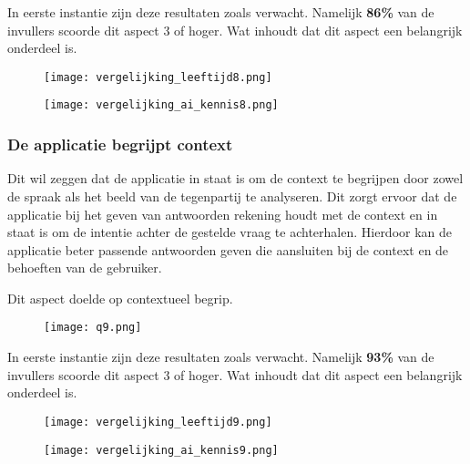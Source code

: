 In eerste instantie zijn deze resultaten zoals verwacht. Namelijk \textbf{86\%} van de invullers scoorde dit aspect 3 of hoger. Wat inhoudt dat dit aspect een belangrijk onderdeel is.

\begin{figure}[htbp]
    \centering
    \texttt{[image: vergelijking\_leeftijd8.png]}
    \label{fig:vergelijking_leeftijd8}
\end{figure}

\begin{figure}[htbp]
    \centering
    \texttt{[image: vergelijking\_ai\_kennis8.png]}
    \label{fig:vergelijking_ai_kennis8}
\end{figure}

\subsubsection{De applicatie begrijpt context}

Dit wil zeggen dat de applicatie in staat is om de context te begrijpen door zowel de spraak als het beeld van de tegenpartij te analyseren. Dit zorgt ervoor dat de applicatie bij het geven van antwoorden rekening houdt met de context en in staat is om de intentie achter de gestelde vraag te achterhalen. Hierdoor kan de applicatie beter passende antwoorden geven die aansluiten bij de context en de behoeften van de gebruiker.

Dit aspect doelde op contextueel begrip.

\begin{figure}[htbp]
    \centering
    \texttt{[image: q9.png]}
    \label{fig:vraag_9_resultaat}
\end{figure}

In eerste instantie zijn deze resultaten zoals verwacht. Namelijk \textbf{93\%} van de invullers scoorde dit aspect 3 of hoger. Wat inhoudt dat dit aspect een belangrijk onderdeel is.

\begin{figure}[htbp]
    \centering
    \texttt{[image: vergelijking\_leeftijd9.png]}
    \label{fig:vergelijking_leeftijd9}
\end{figure}

\begin{figure}[htbp]
    \centering
    \texttt{[image: vergelijking\_ai\_kennis9.png]}
    \label{fig:vergelijking_ai_kennis9}
\end{figure}